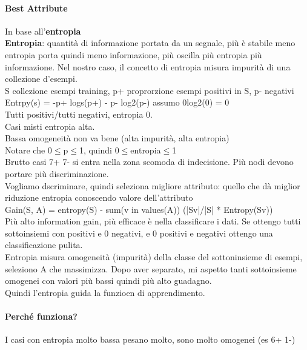 \documentclass[10pt]{book}
\begin{document}
\paragraph{Best Attribute} In base all'\textbf{entropia}\\
\textbf{Entropia}: quantità di informazione portata da un segnale, più è stabile meno entropia porta quindi meno informazione, più oscilla più entropia più informazione. Nel nostro caso, il concetto di entropia misura impurità di una collezione d'esempi.\\
S collezione esempi training, p+ proprorzione esempi positivi in S, p- negativi
Entrpy(s) = -p+ logs(p+) - p- log2(p-) assumo 0log2(0) = 0\\
Tutti positivi/tutti negativi, entropia 0.\\
Casi misti entropia alta.\\
Bassa omogeneità non va bene (alta impurità, alta entropia)\\
Notare che 0$\leq$p$\leq$1, quindi 0$\leq$entropia$\leq$1\\
Brutto casi 7+ 7- si entra nella zona scomoda di indecisione. Più nodi devono portare più discriminazione.\\
Vogliamo dscriminare, quindi seleziona migliore attributo: quello che dà miglior riduzione entropia conoscendo valore dell'attributo\\
Gain(S, A) = entropy(S) - sum(v in values(A)) (|Sv|/|S| * Entropy(Sv))\\
Più alto information gain, più efficace è nella classificare i dati.
Se ottengo tutti sottoinsiemi con positivi e 0 negativi, e 0 positivi e negativi ottengo una classificazione pulita.\\
Entropia misura omogeneità (impurità) della classe del sottoninsieme di esempi, seleziono A che massimizza.
Dopo aver separato, mi aspetto tanti sottoinsieme omogenei con valori più bassi quindi più alto guadagno.\\
Quindi l'entropia guida la funzioen di apprendimento.
\paragraph{Perché funziona?} I casi con entropia molto bassa pesano molto, sono molto omogenei (es 6+ 1-)
\end{document}
